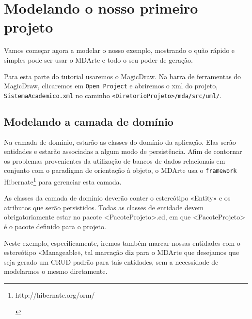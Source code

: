 \begin{framed}
	
\end{framed}

\section{Modelando o nosso primeiro projeto}

Vamos começar agora a modelar o nosso exemplo, mostrando o quão rápido e simples
pode ser usar o MDArte e todo o seu poder de geração.

Para esta parte do tutorial usaremos o MagicDraw. Na barra de ferramentas do
MagicDraw, clicaremos em \texttt{Open Project} e abriremos o xml do projeto,
\texttt{SistemaAcademico.xml} no caminho
\texttt{<DiretorioProjeto>/mda/src/uml/}.

\subsection{Modelando a camada de domínio}
Na camada de domínio, estarão as classes do domínio da aplicação. Elas serão
entidades e estarão associadas a algum modo de persistência. Afim de
contornar os problemas provenientes da utilização de bancos de dados relacionais
em conjunto com o paradigma de orientação à objeto, o MDArte usa o \texttt{framework}
Hibernate\footnote{\hypertarget{http://hibernate.org/orm/}{http://hibernate.org/orm/}}
para gerenciar esta camada.

As classes da camada de domínio deverão conter o estereótipo «Entity» e os
atributos que serão persistidos. Todas as classes de entidade devem
obrigatoriamente estar no pacote <PacoteProjeto>.cd, em que <PacoteProjeto> é o
pacote definido para o projeto.

Neste exemplo, especificamente, iremos também marcar nossas entidades com o
estereótipo «Manageable», tal marcação diz para o MDArte que desejamos que seja
gerado um CRUD padrão para tais entidades, sem a necessidade de modelarmos o
mesmo diretamente.

